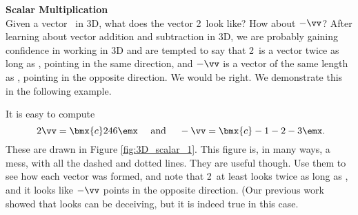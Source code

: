 \medskip

\noindent \large \textsf{\textbf{Scalar Multiplication}} \normalsize\\

Given a vector \vv\ in 3D, what does the vector 2\vv\ look like? How about $-\vv$? After learning about vector addition and subtraction in 3D, we are probably gaining confidence in working in 3D and are tempted to say that 2\vv\ is a vector twice as long as \vv, pointing in the same direction, and $-\vv$ is a vector of the same length as \vv, pointing in the opposite direction. We would be right. We demonstrate this in the following example.\\

{\begin{myfigure}
\begin{center}
\end{center}
\label{fig:3D_scalar_1}
\end{myfigure}

It is easy to compute 
\[\
2\vv = \bmx{c}2\\4\\6\emx \quad \text{ and } \quad -\vv = \bmx{c} -1\\-2\\-3\emx.
\]
These are drawn in Figure \ref{fig:3D_scalar_1}. This figure is, in many ways, a mess, with all the dashed and dotted lines. They are useful though. Use them to see how each vector was formed, and note that 2\vv\ at least looks twice as long as \vv, and it looks like $-\vv$ points in the opposite direction. (Our previous work showed that looks can be deceiving, but it is indeed true in this case. }


